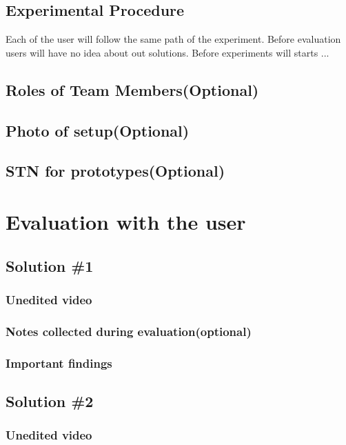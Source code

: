 \documentclass[a4paper,10pt,oneside]{scrreprt}
\begin{document}
\section{Experimental Procedure}
Each of the user will follow the same path of the experiment. Before evaluation users will have no idea about out solutions. Before experiments will starts ...

\section{Roles of Team Members(Optional)}

\section{Photo of setup(Optional)}

\section{STN for prototypes(Optional)}

\begingroup
\let\clearpage\relax
	\chapter{Evaluation with the user}
\endgroup

\section{Solution \#1}
\subsection{Unedited video}

\subsection{Notes collected during evaluation(optional)}

\subsection{Important findings}

\section{Solution \#2}
\subsection{Unedited video}
\end{document}
